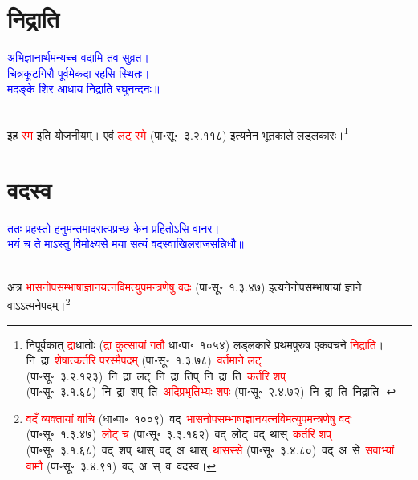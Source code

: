 \section[निद्राति]{निद्राति}
\centering\textcolor{blue}{अभिज्ञानार्थमन्यच्च वदामि तव सुव्रत।\nopagebreak\\
चित्रकूटगिरौ पूर्वमेकदा रहसि स्थितः।\nopagebreak\\
मदङ्के शिर आधाय निद्राति रघुनन्दनः॥}\nopagebreak\\
\\
\fontsize{14}{21}\selectfont\begin{sloppypar}\justifying\noindent\hspace{10mm} इह \textcolor{red}{स्म} इति योजनीयम्। एवं \textcolor{red}{लट् स्मे} (पा॰सू॰~३.२.११८) इत्यनेन भूत\-काले लड्लकारः।\footnote{निपूर्वकात् \textcolor{red}{द्रा}\-धातोः (\textcolor{red}{द्रा कुत्सायां गतौ} धा॰पा॰~१०५४) लड्लकारे प्रथमपुरुष एकवचने \textcolor{red}{निद्राति}। नि~द्रा~\arrow \textcolor{red}{शेषात्कर्तरि परस्मैपदम्} (पा॰सू॰~१.३.७८)~\arrow \textcolor{red}{वर्तमाने लट्} (पा॰सू॰~३.२.१२३)~\arrow नि~द्रा~लट्~\arrow नि~द्रा~तिप्~\arrow नि~द्रा~ति~\arrow \textcolor{red}{कर्तरि शप्} (पा॰सू॰~३.१.६८)~\arrow नि~द्रा~शप्~ति~\arrow \textcolor{red}{अदिप्रभृतिभ्यः शपः} (पा॰सू॰~२.४.७२)~\arrow नि~द्रा~ति~\arrow निद्राति।}\end{sloppypar}
\section[वदस्व]{वदस्व}
\centering\textcolor{blue}{ततः प्रहस्तो हनुमन्तमादरात्पप्रच्छ केन प्रहितोऽसि वानर।\nopagebreak\\
भयं च ते माऽस्तु विमोक्ष्यसे मया सत्यं वदस्वाखिलराजसन्निधौ॥}\nopagebreak\\
\\
\fontsize{14}{21}\selectfont\begin{sloppypar}\justifying\noindent\hspace{10mm} अत्र \textcolor{red}{भासनोपसम्भाषा\-ज्ञान\-यत्न\-विमत्युपमन्त्रणेषु वदः} (पा॰सू॰~१.३.४७) इत्यनेनोपसम्भाषायां ज्ञाने वाऽऽत्मनेपदम्।\footnote{\textcolor{red}{वदँ व्यक्तायां वाचि} (धा॰पा॰~१००९)~\arrow वद्~\arrow \textcolor{red}{भासनोपसम्भाषा\-ज्ञान\-यत्न\-विमत्युपमन्त्रणेषु वदः} (पा॰सू॰~१.३.४७)~\arrow \textcolor{red}{लोट् च} (पा॰सू॰~३.३.१६२)~\arrow वद्~लोट्~\arrow वद्~थास्~\arrow \textcolor{red}{कर्तरि शप्} (पा॰सू॰~३.१.६८)~\arrow वद्~शप्~थास्~\arrow वद्~अ~थास्~\arrow \textcolor{red}{थासस्से} (पा॰सू॰~३.४.८०)~\arrow वद्~अ~से~\arrow \textcolor{red}{सवाभ्यां वामौ} (पा॰सू॰~३.४.९१)~\arrow वद्~अ~स्~व~\arrow वदस्व।}\end{sloppypar}
